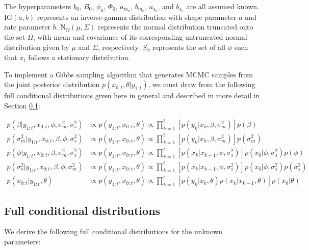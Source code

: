\documentclass{article}
\begin{document}
\noindent The hyperparameters $b_0$, $B_0$, $\phi_0$, $\Phi_0$, $a_{m_0}$, $b_{m_0}$, $a_{s_0}$, and $b_{s_0}$ are all assumed known. $\mbox{IG}(a,b)$ represents an inverse-gamma distribution with shape parameter $a$ and rate parameter $b$. $\mbox{N}_{\Omega}(\mu, \Sigma)$ represents the normal distribution truncated onto the set $\Omega$, with mean and covariance of its corresponding untruncated normal distribution given by $\mu$ and $\Sigma$, respectively. $S_{\phi}$ represents the set of all $\phi$ such that $x_t$ follows a stationary distribution.

To implement a Gibbs sampling algorithm that generates MCMC samples from the joint posterior distribution $p(x_{0:t},\theta|y_{1:t})$, we must draw from the following full conditional distributions given here in general and described in more detail in Section  \ref{sec:fullcond}:

\begin{align*}
p(\beta|y_{1:t},x_{0:t},\phi,\sigma^2_m,\sigma^2_s) &\propto p(y_{1:t},x_{0:t},\theta) \propto \prod_{k=1}^t\left[p(y_k|x_k,\beta,\sigma^2_m)\right]p(\beta) \\
p(\sigma^2_m|y_{1:t},x_{0:t},\beta,\phi,\sigma^2_s) &\propto p(y_{1:t},x_{0:t},\theta) \propto \prod_{k=1}^t\left[p(y_k|x_k,\beta,\sigma^2_m)\right]p(\sigma^2_m) \\
p(\phi|y_{1:t},x_{0:t},\beta,\sigma^2_m,\sigma^2_s) &\propto p(y_{1:t},x_{0:t},\theta) \propto \prod_{k=1}^t\left[p(x_k|x_{k-1},\phi,\sigma^2_s)\right]p(x_0|\phi,\sigma^2_s)p(\phi) \\
p(\sigma^2_s|y_{1:t},x_{0:t},\beta,\phi,\sigma^2_m) &\propto p(y_{1:t},x_{0:t},\theta) \propto \prod_{k=1}^t\left[p(x_k|x_{k-1},\phi,\sigma^2_s)\right]p(x_0|\phi,\sigma^2_s)p(\sigma^2_s) \\
p(x_{0:t}|y_{1:t},\theta) &\propto p(y_{1:t},x_{0:t},\theta) \propto \prod_{k=1}^t\left[p(y_k|x_k,\theta)p(x_k|x_{k-1},\theta)\right]p(x_0|\theta)
\end{align*}

\subsection{Full conditional distributions} \label{sec:fullcond}

We derive the following full conditional distributions for the unknown parameters:
\end{document}
